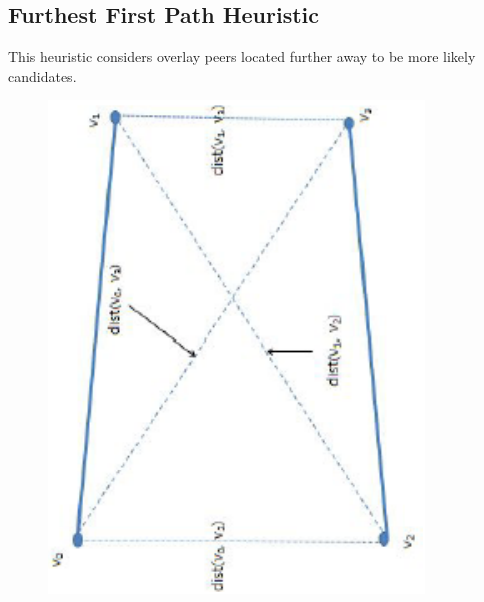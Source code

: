 \documentclass[conference]{IEEEtran}
\begin{document}
\subsection{Furthest First Path Heuristic}
This heuristic considers overlay peers located further away to be more likely candidates.

\begin{algorithm}
\DontPrintSemicolon
{}
\SetAlgoLined
\SetAlgoLongEnd
\scriptsize
{}
\caption{}
\small
\end{algorithm}

\begin{figure}[htbp]
\begin{center}
\includegraphics[scale=0.7,angle=-90]{../../images/external/location_routing/path_similarity_two_destinations}

\end{center}
\end{figure}
\end{document}
